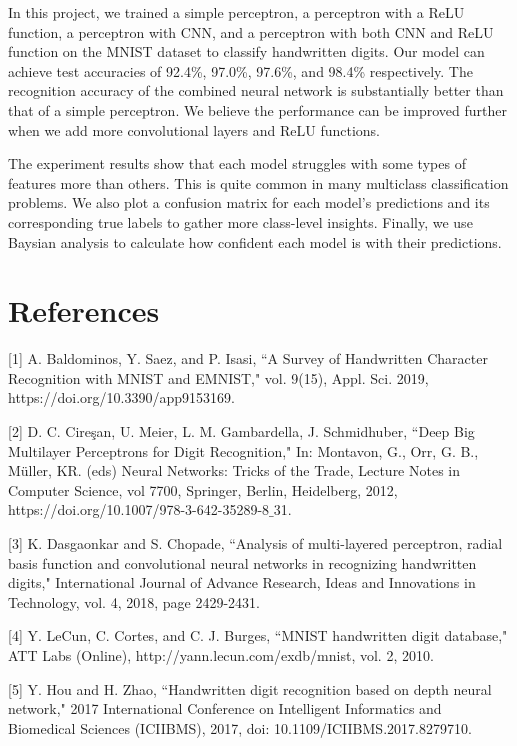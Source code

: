 \documentclass{article}
\begin{document}
In this project, we trained a simple perceptron, a perceptron with a ReLU function, a perceptron with CNN, and a perceptron with both CNN and ReLU function on the MNIST dataset to classify handwritten digits. Our model can achieve test accuracies of 92.4\%, 97.0\%, 97.6\%, and 98.4\% respectively. The recognition accuracy of the combined neural network is substantially better than that of a simple perceptron. We believe the performance can be improved further when we add more convolutional layers and ReLU functions.

The experiment results show that each model struggles with some types of features more than others. This is quite common in many multiclass classification problems. We also plot a confusion matrix for each model's predictions and its corresponding true labels to gather more class-level insights. Finally, we use Baysian analysis to calculate how confident each model is with their predictions.

\section*{References}
\small

%
%


[1] A. Baldominos, Y. Saez, and P. Isasi, ``A Survey of Handwritten Character Recognition with MNIST and EMNIST," vol. 9(15), Appl. Sci. 2019,  https://doi.org/10.3390/app9153169.

[2] D. C. Cire\c{s}an, U. Meier, L. M. Gambardella, J. Schmidhuber, ``Deep Big Multilayer Perceptrons for Digit Recognition," In: Montavon, G., Orr, G. B., M\"{u}ller, KR. (eds) Neural Networks: Tricks of the Trade, Lecture Notes in Computer Science, vol 7700, Springer, Berlin, Heidelberg, 2012, https://doi.org/10.1007/978-3-642-35289-8$\_$31.

[3] K. Dasgaonkar and S. Chopade, ``Analysis of multi-layered perceptron, radial basis function and convolutional neural networks in recognizing handwritten digits," International Journal of Advance Research, Ideas and Innovations in Technology, vol. 4, 2018, page 2429-2431.

[4] Y. LeCun, C. Cortes, and C. J. Burges, ``MNIST handwritten digit database," ATT Labs (Online), http://yann.lecun.com/exdb/mnist, vol. 2, 2010.

[5] Y. Hou and H. Zhao, ``Handwritten digit recognition based on depth neural network," 2017 International Conference on Intelligent Informatics and Biomedical Sciences (ICIIBMS), 2017, doi: 10.1109/ICIIBMS.2017.8279710.
\end{document}

